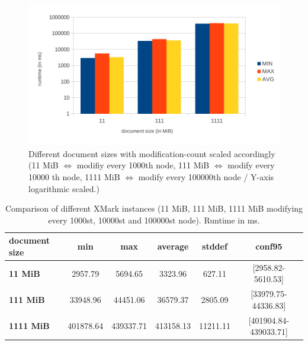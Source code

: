 \begin{figure}[tb]
\centering
\includegraphics[width=\textwidth]{figures/diff-docsize-scale}
\caption{Different document sizes with modification-count scaled accordingly (11 MiB $\Leftrightarrow$ modifiy every 1000th node, 111 MiB $\Leftrightarrow$ modify every 10000 th node, 1111 MiB $\Leftrightarrow$ modify every 100000th node / Y-axis logarithmic scaled.)} 
\label{fig:docScaling}
\end{figure}

\begin{table}[tb]
\centering 
\begin{tabular}[r]{|l|c|c|c|c|c|} 
\hline
\textbf{document size} & \textbf{min} & \textbf{max} & \textbf{average} & \textbf{stddef} & \textbf{conf95}\\
\hline
\hline
\textbf{11 MiB} & 2957.79 & 5694.65 & 3323.96 & 627.11 & [2958.82-5610.53]\\
\hline
\textbf{111 MiB} & 33948.96 & 44451.06 & 36579.37 & 2805.09 & [33979.75-44336.83]\\
\hline
\textbf{1111 MiB} & 401878.64 & 439337.71 & 413158.13 & 11211.11 & [401904.84-439033.71]\\
\hline
\end{tabular}
\label{chap3:compDiffInstances}
\vspace{0.5em} 
\caption{Comparison of different XMark instances (11 MiB, 111 MiB, 1111 MiB modifying every 1000st, 10000st and 100000st node). Runtime in ms.}
\end{table}


